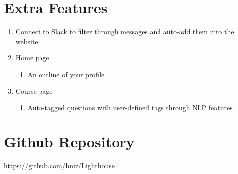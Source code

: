 \documentclass[preprint,11pt,3p]{article}
\begin{document}
\newpage
\section{Extra Features}
\begin{enumerate}
	\item Connect to Slack to filter through messages and auto-add them into the website
	\item Home page
		\begin{enumerate}
			\item An outline of your profile
		\end{enumerate}
	\item Course page
		\begin{enumerate}	
			\item Auto-tagged questions with user-defined tags through NLP features 
		\end{enumerate}	
\end{enumerate}

\section{Github Repository}
\href{https://github.com/hniz/Lighthouse}{https://github.com/hniz/Lighthouse}
\end{document}
